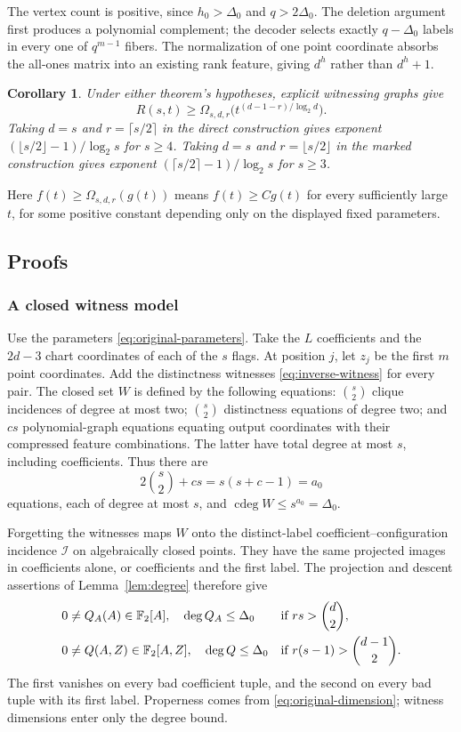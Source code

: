 \documentclass[11pt,a4paper]{article}
\newcommand{\F}{\mathbb F}
\newcommand{\Ical}{\mathcal I}
\DeclareMathOperator{\cdeg}{cdeg}
\newtheorem{corollary}[theorem]{Corollary}
\theoremstyle{definition}
\theoremstyle{remark}
\numberwithin{equation}{section}
\begin{document}
The vertex count is positive, since $h_0>\Delta_0$ and $q>2\Delta_0$. The deletion argument first produces a polynomial complement; the decoder selects exactly $q-\Delta_0$ labels in every one of $q^{m-1}$ fibers. The normalization of one point coordinate absorbs the all-ones matrix into an existing rank feature, giving $d^h$ rather than $d^h+1$.

\begin{corollary}\label{cor:original-ramsey}
Under either theorem's hypotheses, explicit witnessing graphs give
\[
R(s,t)\ge\Omega_{s,d,r}\bigl(t^{(d-1-r)/\log_2 d}\bigr).
\]
Taking $d=s$ and $r=\lceil s/2\rceil$ in the direct construction gives exponent $(\lfloor s/2\rfloor-1)/\log_2 s$ for $s\ge4$. Taking $d=s$ and $r=\lfloor s/2\rfloor$ in the marked construction gives exponent $(\lceil s/2\rceil-1)/\log_2 s$ for $s\ge3$.
\end{corollary}

Here $f(t)\ge\Omega_{s,d,r}(g(t))$ means $f(t)\ge Cg(t)$ for every sufficiently large $t$, for some positive constant depending only on the displayed fixed parameters.

\subsection{Proofs}\label{sec:strict}
\subsubsection{A closed witness model}
Use the parameters \eqref{eq:original-parameters}. Take the $L$ coefficients and the $2d-3$ chart coordinates of each of the $s$ flags. At position $j$, let $z_j$ be the first $m$ point coordinates. Add the distinctness witnesses \eqref{eq:inverse-witness} for every pair. The closed set $W$ is defined by the following equations: $\binom s2$ clique incidences of degree at most two; $\binom s2$ distinctness equations of degree two; and $cs$ polynomial-graph equations equating output coordinates with their compressed feature combinations. The latter have total degree at most $s$, including coefficients. Thus there are
\[
2\binom s2+cs=s(s+c-1)=a_0
\]
equations, each of degree at most $s$, and $\cdeg W\le s^{a_0}=\Delta_0$.

Forgetting the witnesses maps $W$ onto the distinct-label coefficient--configuration incidence $\Ical$ on algebraically closed points. They have the same projected images in coefficients alone, or coefficients and the first label. The projection and descent assertions of Lemma~\ref{lem:degree} therefore give
\begin{align}\label{eq:exceptional-original}
&0\ne Q_A(A)\in\F_2[A],\quad\deg Q_A\le\Delta_0
&&\text{if }rs>\binom d2,\notag\\
&0\ne Q(A,Z)\in\F_2[A,Z],\quad\deg Q\le\Delta_0
&&\text{if }r(s-1)>\binom{d-1}2.
\end{align}
The first vanishes on every bad coefficient tuple, and the second on every bad tuple with its first label. Properness comes from \eqref{eq:original-dimension}; witness dimensions enter only the degree bound.
\end{document}
